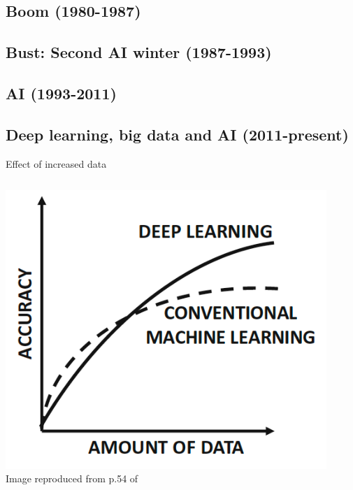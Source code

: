 \subsection{Boom (1980-1987)}
\subsection{Bust: Second AI winter (1987-1993)}
\subsection{AI (1993-2011)}
\subsection{Deep learning, big data and AI (2011-present)}


%
%
%

\begin{frame}[t]{Effect of increased data}

    \begin{columns}
        \begin{column}{0.50\textwidth}
         \begin{center}
          \includegraphics[width=0.95\textwidth]{./images/dl_intro/accuracy_vs_amount_of_data_1.png}\\
          {\scriptsize \color{col:attribution} 
          Image reproduced from p.54 of \cite{Aggarwal:2018SpringerDL}}\\
         \end{center}
        \end{column}
        \begin{column}{0.50\textwidth}
        \end{column}
    \end{columns}


\end{frame}

